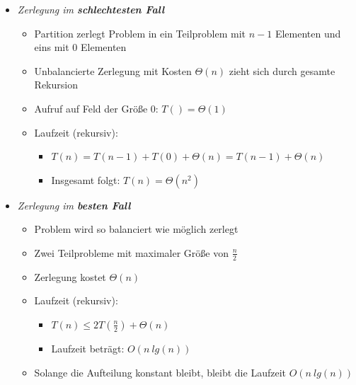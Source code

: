 \documentclass[
    12pt,
    a4paper,
    ngerman,
    color=3b,%
    marginpar=false,
    colorback=false,
    leqno,
]{tudaexercise}
\begin{document}
\begin{itemize}
\begin{itemize}
              \item \textit{Zerlegung im \textbf{schlechtesten Fall}}
                    \begin{itemize}
                        \item Partition zerlegt Problem in ein Teilproblem mit $n-1$ Elementen und eins mit $0$ Elementen
                        \item Unbalancierte Zerlegung mit Kosten $\Theta(n)$ zieht sich durch gesamte Rekursion
                        \item Aufruf auf Feld der Größe 0: $T() = \Theta(1)$
                        \item Laufzeit (rekursiv):
                              \begin{itemize}
                                  \item $T(n) = T(n-1) + T(0) + \Theta(n) = T(n-1) + \Theta(n)$
                                  \item Insgesamt folgt: $T(n) = \Theta(n^2)$
                              \end{itemize}
                    \end{itemize}

              \item \textit{Zerlegung im \textbf{besten Fall}}
                    \begin{itemize}
                        \item Problem wird so balanciert wie möglich zerlegt
                        \item Zwei Teilprobleme mit maximaler Größe von $\frac{n}{2}$
                        \item Zerlegung kostet $\Theta(n)$
                        \item Laufzeit (rekursiv):
                              \begin{itemize}
                                  \item $T(n) \leq 2T(\frac{n}{2}) + \Theta(n)$
                                  \item Laufzeit beträgt: $O(n~lg(n))$
                              \end{itemize}
                        \item Solange die Aufteilung konstant bleibt, bleibt die Laufzeit $O(n~lg(n))$
                    \end{itemize}

          \end{itemize}
\end{itemize}
\clearpage
\end{document}
